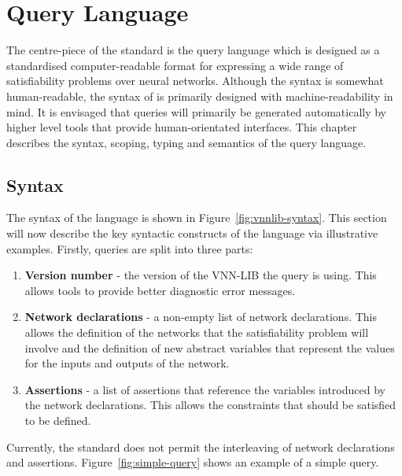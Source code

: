 \chapter{Query Language}
\label{sec:specification_language}

The centre-piece of the \vnnlib{} standard is the \vnnlib{} query language which is designed as a standardised computer-readable format for expressing a wide range of satisfiability problems over neural networks.
Although the syntax is somewhat human-readable, the syntax of \vnnlib{} is primarily designed with machine-readability in mind. 
It is envisaged that \vnnlib{} queries will primarily be generated automatically by higher level tools that provide human-orientated interfaces.
This chapter describes the syntax, scoping, typing and semantics of the query language.

\section{Syntax}
\label{sec:syntax}

The syntax of the language is shown in Figure~\ref{fig:vnnlib-syntax}.  This section will now describe the key syntactic constructs of the language via illustrative examples. Firstly, \vnnlib{} queries are split into three parts: 
\begin{enumerate}
\item \textbf{Version number} - the version of the VNN-LIB the query is using. This allows tools to provide better diagnostic error messages.
\item \textbf{Network declarations} - a non-empty list of network declarations. This allows the definition of the networks that the satisfiability problem will involve and the definition of new abstract variables that represent the values for the inputs and outputs of the network.
\item \textbf{Assertions} - a list of assertions that reference the variables introduced by the network declarations. This allows the constraints that should be satisfied to be defined.
\end{enumerate}
Currently, the standard does not permit the interleaving of network declarations and assertions. Figure~\ref{fig:simple-query} shows an example of a simple query.

